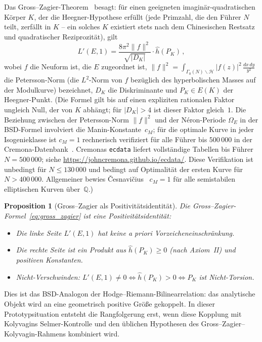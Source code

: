 \documentclass[aps,prd,twocolumn,superscriptaddress,nofootinbib,floatfix]{revtex4-2}
\newtheorem{proposition}[theorem]{Proposition}
\theoremstyle{definition}
\theoremstyle{remark}
\begin{document}
Das Gross--Zagier-Theorem~\cite{GrossZagier1986} besagt: für einen geeigneten imaginär-quadratischen Körper $K$, der die Heegner-Hypothese erfüllt (jede Primzahl, die den Führer $N$ teilt, zerfällt in $K$ -- ein solches $K$ existiert stets nach dem Chinesischen Restsatz und quadratischer Reziprozität), gilt
\begin{equation}
L'(E,1) = \frac{8\pi^2 \|f\|^2}{\sqrt{|D_K|}} \cdot \hat{h}(P_K)\,,
\label{eq:gross_zagier}
\end{equation}
wobei $f$ die Neuform ist, die $E$ zugeordnet ist, $\|f\|^2 = \int_{\Gamma_0(N) \backslash \mathcal{H}} |f(z)|^2 \, \frac{dx\,dy}{y^2}$ die Petersson-Norm (die $L^2$-Norm von $f$ bezüglich des hyperbolischen Masses auf der Modulkurve) bezeichnet, $D_K$ die Diskriminante und $P_K \in E(K)$ der Heegner-Punkt. (Die Formel gilt bis auf einen expliziten rationalen Faktor ungleich Null, der von $K$ abhängt; für $|D_K| > 4$ ist dieser Faktor gleich~$1$. Die Beziehung zwischen der Petersson-Norm $\|f\|^2$ und der Néron-Periode $\Omega_E$ in der BSD-Formel involviert die Manin-Konstante~$c_M$; für die optimale Kurve in jeder Isogenieklasse ist $c_M = 1$ rechnerisch verifiziert für alle Führer bis $500\,000$ in der Cremona-Datenbank~\cite{LMFDB}. Cremonas \texttt{ecdata} liefert vollständige Tabellen bis Führer $N = 500\,000$; siehe \url{https://johncremona.github.io/ecdata/}. Diese Verifikation ist unbedingt für $N \leq 130\,000$ und bedingt auf Optimalität der ersten Kurve für $N > 400\,000$. Allgemeiner bewies Česnavičius~\cite{Cesnavicius2018} $c_M = 1$ für alle semistabilen elliptischen Kurven über~$\mathbb{Q}$.)

\begin{proposition}[Gross--Zagier als Positivitätsidentität]
\label{prop:gz_positivity}
Die Gross--Zagier-Formel~\eqref{eq:gross_zagier} ist eine Positivitätsidentität:
\begin{itemize}
\item Die linke Seite $L'(E,1)$ hat keine a priori Vorzeicheneinschränkung.
\item Die rechte Seite ist ein Produkt aus $\hat{h}(P_K) \geq 0$ (nach Axiom~II) und positiven Konstanten.
\item Nicht-Verschwinden: $L'(E,1) \neq 0 \iff \hat{h}(P_K) > 0 \iff P_K$ ist Nicht-Torsion.
\end{itemize}
\end{proposition}

Dies ist das BSD-Analogon der Hodge--Riemann-Bilinearrelation: das analytische Objekt wird an eine geometrisch positive Größe gekoppelt. In dieser Prototypsituation entsteht die Rangfolgerung erst, wenn diese Kopplung mit Kolyvagins Selmer-Kontrolle und den üblichen Hypothesen des Gross--Zagier--Kolyvagin-Rahmens kombiniert wird.
\end{document}
